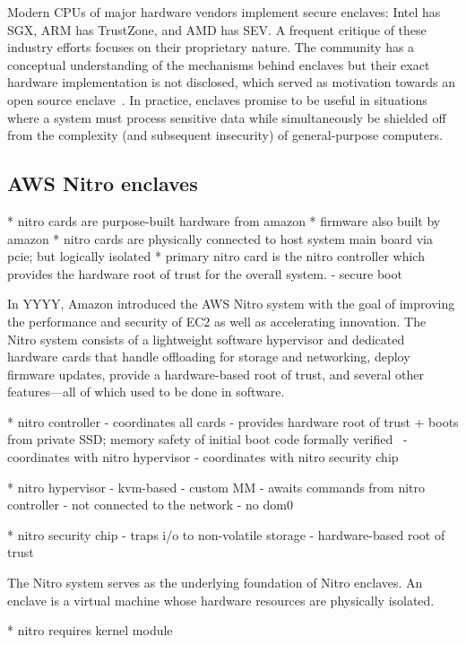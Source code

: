 Modern CPUs of major hardware vendors implement secure enclaves: Intel has SGX,
ARM has TrustZone, and AMD has SEV.  A frequent critique of these industry
efforts focuses on their proprietary nature. The community has a conceptual
understanding of the mechanisms behind enclaves but their exact hardware
implementation is not disclosed, which served as motivation towards an open
source enclave~\cite{Lee20a}.  In practice, enclaves promise to be useful in
situations where a system must process sensitive data while simultaneously be
shielded off from the complexity (and subsequent insecurity) of general-purpose
computers.

\subsection{AWS Nitro enclaves}
\label{sec:nitro}

* nitro cards are purpose-built hardware from amazon
* firmware also built by amazon
* nitro cards are physically connected to host system main board via pcie; but
logically isolated
* primary nitro card is the nitro controller which provides the hardware root of
trust for the overall system.
  - secure boot


In YYYY, Amazon introduced the AWS Nitro system with the goal of improving
the performance and security of EC2 as well as accelerating innovation.
The Nitro system consists of a lightweight software hypervisor and
dedicated hardware cards that handle offloading for storage and networking,
deploy firmware updates, provide a hardware-based root of trust, and several
other features---all of which used to be done in software.

* nitro controller
  - coordinates all cards
  - provides hardware root of trust
    + boots from private SSD; memory safety of initial boot code formally verified~\cite{Cook2018a}
  - coordinates with nitro hypervisor
  - coordinates with nitro security chip

* nitro hypervisor
  - kvm-based
  - custom MM
  - awaits commands from nitro controller
  - not connected to the network
  - no dom0

* nitro security chip
  - traps i/o to non-volatile storage
  - hardware-based root of trust


The Nitro system serves as the underlying foundation of Nitro enclaves.
An enclave is a virtual machine whose hardware resources are physically
isolated.


* nitro requires kernel module



